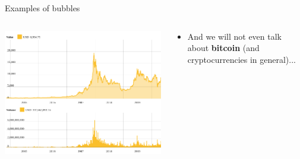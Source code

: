 \documentclass[english,10pt
,aspectratio=169
]{beamer}
\begin{document}
\begin{frame}{Examples of bubbles}
	\begin{columns}
		\begin{column}{0.55\linewidth}
			\center
			\includegraphics[width=\linewidth]{pics/bitcoin}
		\end{column}
		\begin{column}{0.45\linewidth}
			\begin{itemize}
				\item And we will not even talk about \textbf{bitcoin} (and cryptocurrencies in general)...
			\end{itemize}
		\end{column}
	\end{columns}
\end{frame}
\end{document}
